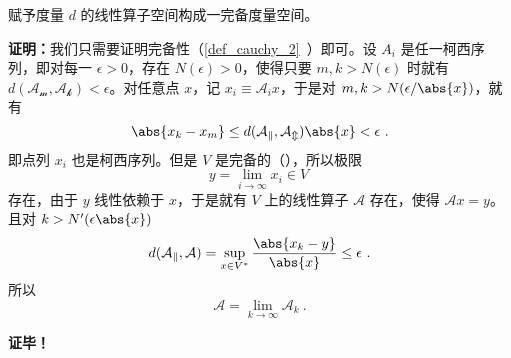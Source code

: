 \begin{theorem}{}
赋予度量 $d$ 的线性算子空间构成一完备度量空间。
\end{theorem}
\textbf{证明：}我们只需要证明完备性（\autoref{def_cauchy_2}~）即可。设 $A_i$ 是任一柯西序列，即对每一 $\epsilon>0$，存在 $N(\epsilon)>0$，使得只要 $m,k>N(\epsilon)$ 时就有 $d(\mathcal{A_m,A_k})<\epsilon$。对任意点 $x$，记 $x_i\equiv\mathcal A_i x$，于是对 $m,k>N(\epsilon/\abs{x})$，就有
\begin{equation}
\abs{x_k-x_m}\leq d(\mathcal{A_k,A_m})\abs{x}<\epsilon~.
\end{equation}
即点列 $x_i$ 也是柯西序列。但是 $V$ 是完备的（），所以极限
\begin{equation}
y=\lim_{i\rightarrow\infty}x_i\in V~
\end{equation}
存在，由于 $y$ 线性依赖于 $x$，于是就有 $V$ 上的线性算子 $\mathcal A$ 存在，使得 $\mathcal Ax=y$。且对 $k>N'(\epsilon\abs{x})$
\begin{equation}
d(\mathcal{A_k,A})=\sup\limits_{x\in{V^*}}\frac{\abs{x_k -y}}{\abs{x}}\leq\epsilon~.
\end{equation}
所以 
\begin{equation}
\mathcal A=\lim_{k\rightarrow\infty}\mathcal A_k~.
\end{equation}

\textbf{证毕！}